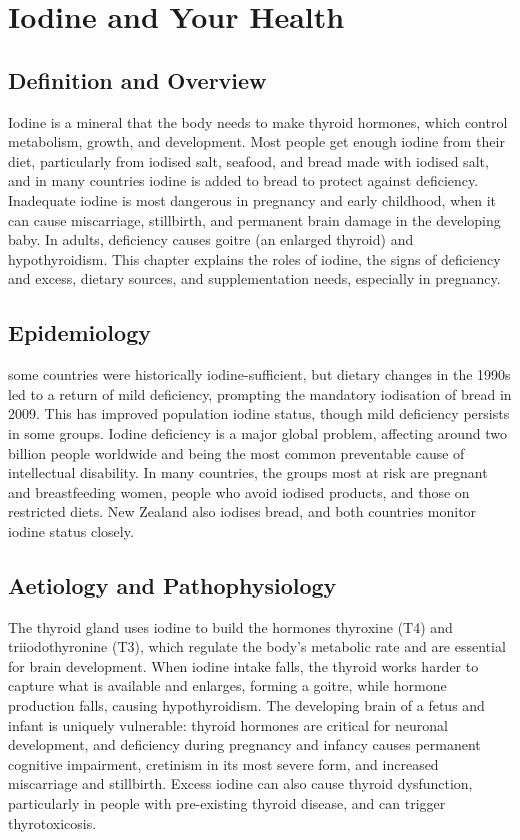 \chapter{Iodine and Your Health}

\section*{Definition and Overview}
Iodine is a mineral that the body needs to make thyroid hormones, which control metabolism, growth, and development. Most people get enough iodine from their diet, particularly from iodised salt, seafood, and bread made with iodised salt, and in many countries iodine is added to bread to protect against deficiency. Inadequate iodine is most dangerous in pregnancy and early childhood, when it can cause miscarriage, stillbirth, and permanent brain damage in the developing baby. In adults, deficiency causes goitre (an enlarged thyroid) and hypothyroidism. This chapter explains the roles of iodine, the signs of deficiency and excess, dietary sources, and supplementation needs, especially in pregnancy.

\section*{Epidemiology}
some countries were historically iodine-sufficient, but dietary changes in the 1990s led to a return of mild deficiency, prompting the mandatory iodisation of bread in 2009. This has improved population iodine status, though mild deficiency persists in some groups. Iodine deficiency is a major global problem, affecting around two billion people worldwide and being the most common preventable cause of intellectual disability. In many countries, the groups most at risk are pregnant and breastfeeding women, people who avoid iodised products, and those on restricted diets. New Zealand also iodises bread, and both countries monitor iodine status closely.

\section*{Aetiology and Pathophysiology}
The thyroid gland uses iodine to build the hormones thyroxine (T4) and triiodothyronine (T3), which regulate the body's metabolic rate and are essential for brain development. When iodine intake falls, the thyroid works harder to capture what is available and enlarges, forming a goitre, while hormone production falls, causing hypothyroidism. The developing brain of a fetus and infant is uniquely vulnerable: thyroid hormones are critical for neuronal development, and deficiency during pregnancy and infancy causes permanent cognitive impairment, cretinism in its most severe form, and increased miscarriage and stillbirth. Excess iodine can also cause thyroid dysfunction, particularly in people with pre-existing thyroid disease, and can trigger thyrotoxicosis.

